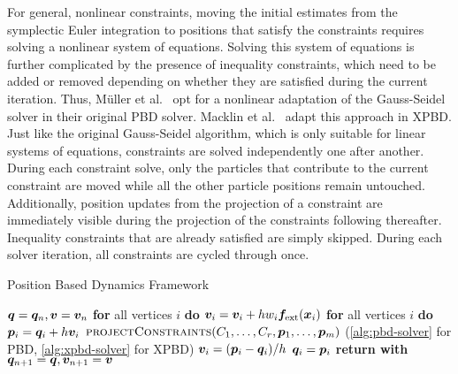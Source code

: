 For general, nonlinear constraints, moving the initial estimates from the symplectic Euler integration to positions that satisfy the constraints
requires solving a nonlinear system of equations. Solving this system of equations is further complicated by the presence of inequality constraints, which
need to be added or removed depending on whether they are satisfied during the current iteration. Thus, Müller et al.\ \cite{mueller2006} opt for a 
nonlinear adaptation of the Gauss-Seidel solver in their original PBD solver. Macklin et al.\ \cite{macklin2016} adapt this approach in XPBD. 
Just like the original Gauss-Seidel algorithm, which is only suitable for linear systems of equations, 
constraints are solved independently one after another. During each constraint solve, only the particles that contribute to the current constraint are
moved while all the other particle positions remain untouched. Additionally, position updates from the projection of a constraint are immediately 
visible during the projection of the constraints following thereafter. Inequality constraints that are already satisfied are simply skipped. 
During each solver iteration, all constraints are cycled through once.

\begin{algorithm}[tb]
\caption{Position Based Dynamics Framework}\label{alg:pbd}
\begin{algorithmic}[1]
\State $\bm{q} = \bm{q}_n, \bm{v} = \bm{v}_n$
\State \textbf{for} all vertices $i$ \textbf{do} $\bm{v}_i = \bm{v}_i + hw_i\bm{f}_{\text{ext}}(\bm{x}_i)$
\State \textbf{for} all vertices $i$ \textbf{do} $\bm{p}_i = \bm{q}_i + h\bm{v}_i$
\State $\textsc{projectConstraints}(C_1, \ldots, C_r, \bm{p}_1, \ldots, \bm{p}_m)$ (\cref{alg:pbd-solver} for PBD, 
\StatexIndent[2] \cref{alg:xpbd-solver} for XPBD)
\State $\bm{v}_i = (\bm{p}_i - \bm{q}_i) / h$
\State $\bm{q}_i = \bm{p}_i$
\EndFor
\State \textbf{return with } $\bm{q}_{n+1} = \bm{q}, \bm{v}_{n+1} = \bm{v}$
\EndProcedure
\end{algorithmic}
\end{algorithm}


